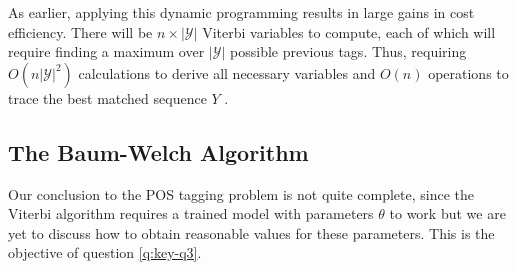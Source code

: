 \documentclass[../main.tex]{subfiles}
\begin{document}


As earlier, applying this dynamic programming results in large gains in cost efficiency. There will be $n \times |\mathcal{Y}|$ Viterbi variables to compute, each of which will require finding a maximum over $|\mathcal{Y}|$ possible previous tags. Thus, requiring $O(n|\mathcal{Y}|^2)$ calculations to derive all necessary variables and $O(n)$ operations to trace the best matched sequence $Y$ \autocite{eisenstein-nlp-2019}.

\subsection{The Baum-Welch Algorithm}

Our conclusion to the POS tagging problem is not quite complete, since the Viterbi algorithm requires a trained model with parameters $\theta$ to work but we are yet to discuss how to obtain reasonable values for these  parameters.
This is the objective of question \ref{q:key-q3}.
\end{document}

